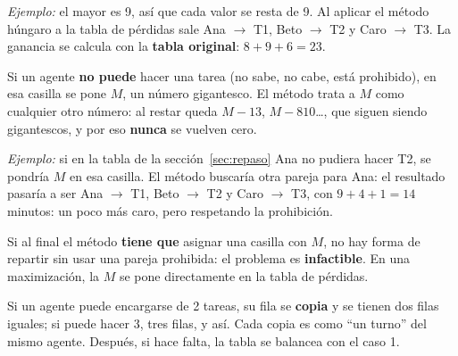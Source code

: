\documentclass[11pt,a4paper]{article}
\let\pasobase\paso
\renewcommand{\paso}[1]{\needspace{7\baselineskip}\pasobase{#1}}
\newcommand{\rejilla}[3]{%
  \foreach \i in {2,...,#2}{\foreach \j in {2,...,#3}{%
    \draw[gray!55, thin] (#1-\i-\j.north west) rectangle (#1-\i-\j.south east);}}%
  \draw[thick] (#1-2-2.north west) rectangle (#1-#2-#3.south east);}
\newcommand{\pie}[4]{\node[font=\footnotesize, below=1mm, align=center] at ($(#1-#2-2.south west)!0.5!(#1-#2-#3.south east)$) {#4};}
\begin{document}
\begin{minipage}[c]{0.52\textwidth}
\centering
{}\quad
{}
\end{minipage}\hfill
\begin{minipage}[c]{0.46\textwidth}
\textit{Ejemplo:} el mayor es 9, así que cada valor se resta de 9. Al aplicar el método húngaro a la tabla de
pérdidas sale Ana $\to$ T1, Beto $\to$ T2 y Caro $\to$ T3. La ganancia se calcula con la \textbf{tabla original}:
$8 + 9 + 6 = 23$.
\end{minipage}



Si un agente \textbf{no puede} hacer una tarea (no sabe, no cabe, está prohibido), en esa casilla se pone $M$,
un número gigantesco. El método trata a $M$ como cualquier otro número: al restar queda $M - 13$, $M - 810$\dots,
que siguen siendo gigantescos, y por eso \textbf{nunca} se vuelven cero.

\textit{Ejemplo:} si en la tabla de la sección~\ref{sec:repaso} Ana no pudiera hacer T2, se pondría $M$ en esa
casilla. El método buscaría otra pareja para Ana: el resultado pasaría a ser Ana $\to$ T1, Beto $\to$ T2 y
Caro $\to$ T3, con $9 + 4 + 1 = 14$ minutos: un poco más caro, pero respetando la prohibición.

Si al final el método \textbf{tiene que} asignar una casilla con $M$, no hay forma de repartir sin usar una
pareja prohibida: el problema es \textbf{infactible}. En una maximización, la $M$ se pone directamente en la tabla
de pérdidas.

Si un agente puede encargarse de 2 tareas, su fila se \textbf{copia} y se tienen dos filas iguales; si puede
hacer 3, tres filas, y así. Cada copia es como ``un turno'' del mismo agente. Después, si hace falta, la tabla se
balancea con el caso 1.
\end{document}

